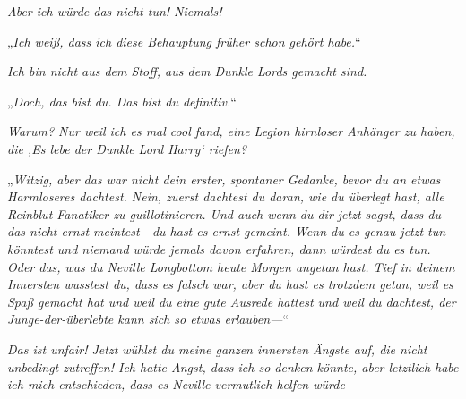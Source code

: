 \emph{Aber ich würde das nicht tun! Niemals! }

„\emph{Ich weiß, dass ich diese Behauptung früher schon gehört habe.}“

\emph{Ich bin nicht aus dem Stoff, aus dem Dunkle Lords gemacht sind. }

„\emph{Doch, das bist du. Das bist du \emph{definitiv}.}“

\emph{Warum? Nur weil ich es mal cool fand, eine Legion hirnloser Anhänger zu haben, die ‚Es lebe der Dunkle Lord Harry‘ riefen? }

„\emph{Witzig, aber das war nicht dein erster, spontaner Gedanke, bevor du an etwas Harmloseres dachtest. Nein, zuerst dachtest du daran, wie du überlegt hast, alle Reinblut-Fanatiker zu guillotinieren. Und auch wenn du dir jetzt sagst, dass du das nicht ernst meintest—du hast es ernst gemeint. Wenn du es genau jetzt tun könntest und niemand würde jemals davon erfahren, dann würdest du es tun. Oder das, was du Neville Longbottom heute Morgen angetan hast. Tief in deinem Innersten \emph{wusstest} du, dass es falsch war, aber du hast es \emph{trotzdem} getan, weil es \emph{Spaß} gemacht hat und weil du eine \emph{gute Ausrede} hattest und weil du dachtest, der Junge-der-überlebte kann sich so etwas erlauben—}“

\emph{Das ist unfair! Jetzt wühlst du meine ganzen innersten Ängste auf, die nicht unbedingt zutreffen! Ich \emph{hatte Angst}, dass ich so denken \emph{könnte}, aber letztlich habe ich mich entschieden, dass es Neville vermutlich \emph{helfen} würde—}

